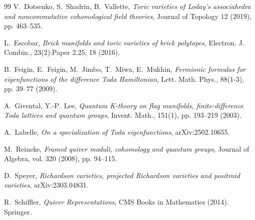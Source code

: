 \documentclass[12pt,a4paper]{amsart}
\numberwithin{equation}{section}
\theoremstyle{remark}
\begin{document}
\begin{thebibliography}{99}
V.~Dotsenko, S.~Shadrin, B.~Vallette,
\emph{Toric varieties of Loday's associahedra and noncommutative cohomological field theories},
Journal of Topology 12 (2019), pp. 463--535.



L.~Escobar, \emph{Brick manifolds and toric varieties of brick polytopes},
Electron. J. Combin., 23(2):Paper 2.25, 18 (2016).


B.~Feigin, E.~Feigin, M.~Jimbo, T.~Miwa, E.~Mukhin,
\emph{Fermionic formulas for eigenfunctions of the difference Toda Hamiltonian},
Lett. Math. Phys., 88(1-3), pp. 39--77 (2009).

A.~Givental, Y.-P.~Lee, 
\emph{Quantum K-theory on flag manifolds, finite-difference Toda lattices and quantum
groups}, Invent. Math., 151(1), pp. 193--219 (2003).

 A.~Labelle, 
\emph{On a specialization of Toda eigenfunctions}, arXiv:2502.10655. 

 M.~Reineke, \emph{Framed quiver moduli, cohomology and quantum groups},
Journal of Algebra, vol. 320 (2008), pp. 94--115.

 D.~Speyer, \emph{Richardson varieties, projected Richardson varieties 
and positroid varieties}, arXiv:2303.04831.

R.~Schiffler, \emph{Quiver Representations}, CMS Books in Mathematics (2014). Springer.

\end{thebibliography}
\end{document}
